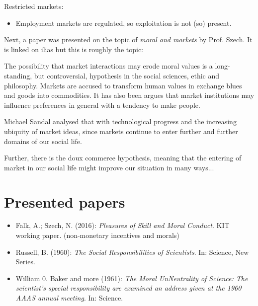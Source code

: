 Restricted markets:

\begin{itemize}
	\item Employment markets are regulated, so exploitation is not (so) present.
\end{itemize}



Next, a paper was presented on the topic of \textit{moral and markets} by Prof. Szech. It is linked on ilias but this is roughly the topic:


The possibility that market interactions may erode moral values is a long-standing, but controversial, hypothesis in the social sciences, ethic and philosophy. Markets are accused to transform human values in exchange blues and goods into commodities. It has also been argues that market institutions may influence preferences in general with a tendency to make people.

Michael Sandal analysed that with technological progress and the increasing ubiquity of market ideas, since markets continue to enter further and further domains of our social life.


Further, there is the doux commerce hypothesis, meaning that the entering of market in our social life might improve our situation in many ways...


\section{Presented papers}

\begin{itemize}
	\item Falk, A.; Szech, N. (2016): \textit{Pleasures of Skill and Moral Conduct}. KIT working paper. (non-monetary incentives and morals)
	\item Russell, B. (1960): \textit{The Social Responsibilities of Scientists}. In: Science, New Series.
	\item William 0. Baker and more (1961): \textit{The Moral UnNeutrality of Science: The scientist's special responsibility are examined an address given at the 1960 AAAS annual meeting}. In: Science.
\end{itemize}


\newpage